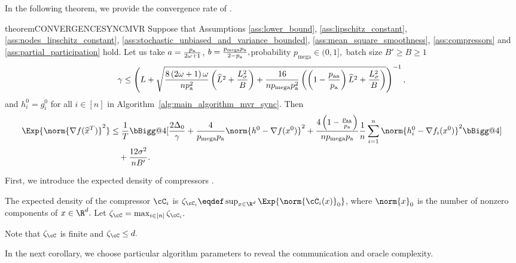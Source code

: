 \documentclass{article}
\makeatletter
\newcommand{\algorithmname}{DASHA-PP}
\newcommand*{\probavailable}{\ensuremath{p_{\textnormal{a}}}}
\newcommand*{\probpairaa}{\ensuremath{p_{\textnormal{aa}}}}
\newcommand*{\probmega}{\ensuremath{p_{\text{mega}}}}
\newcommand{\vast}{\bBigg@{4}}
\makeatother
\begin{document}
  In the following theorem, we provide the convergence rate of \algname{\algorithmname-SYNC-MVR}.

  \begin{restatable}{theorem}{CONVERGENCESYNCMVR}
    \label{theorem:sync_stochastic}
    Suppose that Assumptions \ref{ass:lower_bound}, \ref{ass:lipschitz_constant}, \ref{ass:nodes_lipschitz_constant}, \ref{ass:stochastic_unbiased_and_variance_bounded}, \ref{ass:mean_square_smoothness}, \ref{ass:compressors} and \ref{ass:partial_participation} hold. Let us take $a = \frac{\probavailable}{2\omega + 1}$, $b = \frac{\probmega \probavailable}{2 - \probavailable},$probability $\probmega \in (0, 1],$ batch size $B' \geq B \geq 1$ $$\gamma \leq \left(L + \sqrt{\frac{8 \left(2\omega + 1\right) \omega}{n \probavailable^2}\left(\widehat{L}^2 + \frac{L_{\sigma}^2}{B}\right) + \frac{16}{n \probmega \probavailable^2} \left(\left(1 - \frac{\probpairaa}{\probavailable}\right) \widehat{L}^2 + \frac{L_{\sigma}^2}{B}\right)}\right)^{-1},$$ and $h^{0}_i = g^{0}_i$ for all $i \in [n]$
    in Algorithm~\ref{alg:main_algorithm_mvr_sync}. Then 
    \begin{align*}
      \Exp{\norm{\nabla f(\widehat{x}^T)}^2} &\leq \frac{1}{T}\vast[\frac{2 \Delta_0}{\gamma} + \frac{4}{\probmega \probavailable} \norm{h^{0} - \nabla f(x^{0})}^2 + \frac{4 \left(1 - \frac{\probpairaa}{\probavailable}\right)}{n \probmega \probavailable}\frac{1}{n}\sum_{i=1}^n\norm{h^{0}_i - \nabla f_i(x^{0})}^2 \vast] \\
      &\quad + \frac{12 \sigma^2}{n B'}.
    \end{align*}
  \end{restatable}

  First, we introduce the expected density of compressors \citep{MARINA,tyurin2022dasha}.

  \begin{definition}
    \label{def:expected_density}
    The expected density of the compressor $\cC_i$ is $\zeta_{\cC_i} \eqdef \sup_{x \in \R^d} \Exp{\norm{\cC_i(x)}_0}$, where $\norm{x}_0$ is the number of nonzero components of $x \in \R^d.$ Let  $\zeta_{\cC} = \max_{i \in [n]} \zeta_{\cC_i}.$
  \end{definition}

  Note that $\zeta_{\cC}$ is finite and $\zeta_{\cC} \leq d.$

  In the next corollary, we choose particular algorithm parameters to reveal the communication and oracle complexity.
\end{document}
